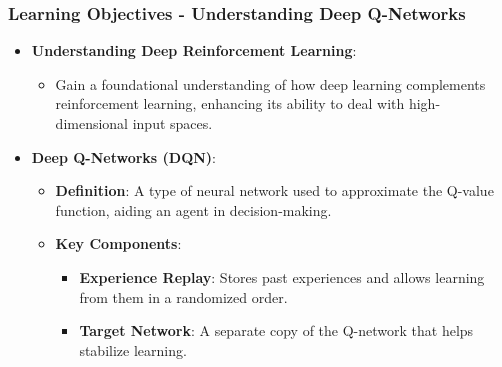 \documentclass[aspectratio=169]{beamer}
\begin{document}
\begin{frame}[fragile]
    \frametitle{Learning Objectives - Understanding Deep Q-Networks}
    \begin{itemize}
        \item \textbf{Understanding Deep Reinforcement Learning}:
        \begin{itemize}
            \item Gain a foundational understanding of how deep learning complements reinforcement learning, enhancing its ability to deal with high-dimensional input spaces.
        \end{itemize}
        
        \item \textbf{Deep Q-Networks (DQN)}:
        \begin{itemize}
            \item \textbf{Definition}: A type of neural network used to approximate the Q-value function, aiding an agent in decision-making.
            \item \textbf{Key Components}:
            \begin{itemize}
                \item \textbf{Experience Replay}: Stores past experiences and allows learning from them in a randomized order.
                \item \textbf{Target Network}: A separate copy of the Q-network that helps stabilize learning.
            \end{itemize}
        \end{itemize}
    \end{itemize}
\end{frame}
\end{document}
